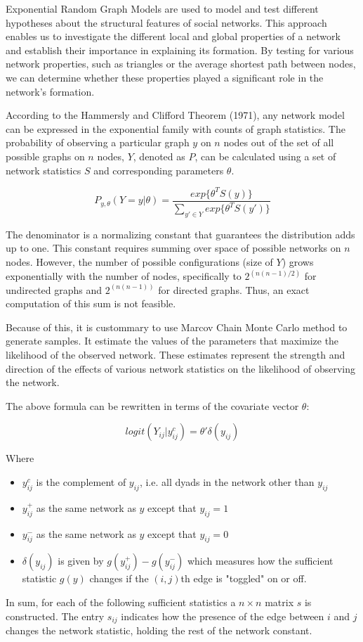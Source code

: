 Exponential Random Graph Models are used to model and test different hypotheses about the 
structural features of social networks. This approach enables us to investigate the different 
local and global properties of a network and establish their importance in explaining its 
formation. By testing for various network properties, such as triangles or the average shortest 
path between nodes, we can determine whether these properties played a significant role in the 
network's formation.

According to the Hammersly and Clifford Theorem (1971), any network model can be expressed in the 
exponential family with counts of graph statistics. The probability of observing a particular graph 
$y$ on $n$ nodes out of the set of all possible graphs on $n$ nodes, $Y$, denoted as $P$, can be 
calculated using a set of network statistics $S$ and corresponding parameters $\theta$.

$$
P_{y,\theta}(Y=y|\theta) = \frac{exp\{\theta^T S(y)\}}{\sum\limits_{y' \in Y} exp\{\theta^T S(y')\}}
$$

The denominator is a normalizing constant that guarantees the distribution adds up to one. 
This constant requires summing over space of possible networks on $n$ nodes. However, the number 
of possible configurations (size of $Y$) grows exponentially with the number of nodes, specifically 
to $2^{(n(n-1)/2)}$ for undirected graphs and $2^{(n(n-1))}$ for directed graphs. Thus, an exact 
computation of this sum is not feasible.

Because of this, it is custommary to use Marcov Chain Monte Carlo method to generate samples. It 
estimate the values of the parameters that maximize the likelihood of the observed network. These 
estimates represent the strength and direction of the effects of various network statistics on the 
likelihood of observing the network.

The above formula can be rewritten in terms of the covariate vector $\theta$:

$$
logit(Y_{ij} | y_{ij}^c) = \theta' \delta(y_{ij})
$$

Where
\begin{itemize}
\item $y_{ij}^c$ is the complement of $y_{ij}$, i.e. all dyads in the network other than $y_{ij}$
\item $y_{ij}^+$ as the same network as $y$ except that $y_{ij} = 1$
\item $y_{ij}^-$ as the same network as $y$ except that $y_{ij} = 0$
\item $\delta(y_{ij})$ is given by $g(y_{ij}^+) - g(y_{ij}^-)$ which measures how the sufficient 
statistic $g(y)$ changes if the $(i, j)$th edge is "toggled" on or off.
\end{itemize}

In sum, for each of the following sufficient statistics a $n \times n$ matrix $s$ is constructed. 
The entry $s_{ij}$ indicates how the presence of the edge between $i$ and $j$ changes the network 
statistic, holding the rest of the network constant.
